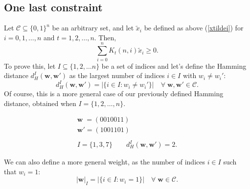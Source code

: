 \subsection{One last constraint}
Let $\mathcal{C} \subseteq \{0,1\}^n$ be an arbitrary set, and let $\tilde{x}_i$ be defined as above (\ref{xtildei}) for $i=0,1,\ldots,n$ and $t=1,2,\ldots,n$.
Then,
\begin{equation}
    \sum_{i=0}^{n}K_t(n,i) \tilde{x}_i \geq 0.
\end{equation}
To prove this, let $I \subseteq \{1,2,\ldots n\}$ be a set of indices and let's define the Hamming distance $d_H^I(\mathbf{w}, \mathbf{w}')$ as the largest number of indices $i \in I$ with $w_i \neq w_i'$:
\begin{equation}
    d_H^I(\mathbf{w}, \mathbf{w}') = |\{i \in I : w_i \neq w_i'\}| \quad\forall\; \mathbf{w}, \mathbf{w}' \in \mathcal{C}.
\end{equation}
Of course, this is a more general case of our previously defined Hamming distance, obtained when $I = \{1, 2, \ldots, n\}$.
\begin{example}
    \begin{equation*}
        \begin{array}{l}
            \mathbf{w} \;= (0010011) \\
            \mathbf{w}' = (1001101) \\\\
            I = \{1,3,7\} \quad\quad d_H^I(\mathbf{w}, \mathbf{w}') = 2.
        \end{array}
    \end{equation*}
\end{example}
We can also define a more general weight, as the number of indices $i \in I$ such that $w_i=1$:
\begin{equation}
    |\mathbf{w}|_I = |\{i \in I : w_i = 1\}| \quad\forall\;\mathbf{w}\in\mathcal{C}.
\end{equation}
